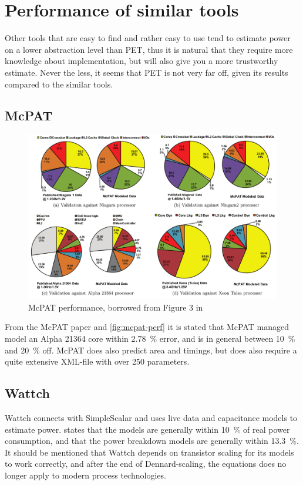 \section{Performance of similar tools}
Other tools that are easy to find and rather easy to use tend to estimate
power on a lower abstraction level than PET, thus it is natural that they
require more knowledge about implementation, but will also give you a more
trustworthy estimate. Never the less, it seems that PET is not very far off,
given its results compared to the similar tools.

\subsection{McPAT}

\begin{figure}[htb]
\includegraphics[width=\textwidth]{figs/mcpat-performance.png}
\caption{McPAT performance, borrowed from Figure 3 in \cite{li2009mcpat}}
\label{fig:mcpat-perf}
\end{figure}

From the McPAT paper \cite{li2009mcpat} and \autoref{fig:mcpat-perf} it is
stated that McPAT managed model an Alpha 21364 core within 2.78~\% error, and is
in general between 10~\% and 20~\% off. McPAT does also predict area and timings,
but does also require a quite extensive XML-file with over 250 parameters.

\subsection{Wattch}

Wattch connects with SimpleScalar and uses live data and capacitance models to
estimate power. \cite{brooks2000wattch} states that the models are generally
within 10~\% of real power consumption, and that the power breakdown models are
generally within 13.3~\%. It should be mentioned that Wattch depends on
transistor scaling for its models to work correctly, and after the end of
Dennard-scaling, the equations does no longer apply to modern process
technologies.


